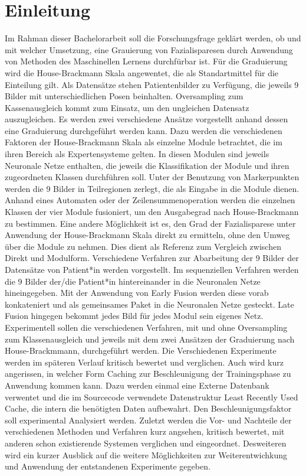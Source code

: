 
\chapter{Einleitung}
\label{einleitung}

Im Rahman dieser Bachelorarbeit soll die Forschungsfrage geklärt werden, ob und mit welcher Umsetzung, eine Grauierung von Fazialisparesen durch Anwendung von Methoden des Maschinellen Lernens durchfürbar ist. Für die Graduierung wird die House-Brackmann Skala angewentet, die als Standartmittel für die Einteilung gilt. Als Datensätze stehen Patientenbilder zu Verfügung, die jeweils 9 Bilder mit unterschiedlichen Posen beinhalten. Oversampling zum Kassenausgleich kommt zum Einsatz, um den ungleichen Datensatz auszugleichen.
Es werden zwei verschiedene Ansätze vorgestellt anhand dessen eine Graduierung durchgeführt werden kann. Dazu werden die verschiedenen Faktoren der House-Brackmann Skala als einzelne Module betrachtet, die im ihren Bereich als Expertensysteme gelten. In diesen Modulen sind jeweils Neuronale Netze enthalten, die jeweils die Klassifikation der Module und ihren zugeordneten Klassen durchführen soll. Unter der Benutzung von Markerpunkten werden die 9 Bilder in Teilregionen zerlegt, die als Eingabe in die Module dienen. Anhand eines Automaten oder der Zeilensummenoperation werden die einzelnen Klassen der vier Module fusioniert, um den Ausgabegrad nach House-Brackmann zu bestimmen. Eine andere Möglichkeit ist es, den Grad der Fazialisparese unter Anwendung der House-Brackmann Skala direkt zu ermitteln, ohne den Umweg über die Module zu nehmen. Dies dient als Referenz zum Vergleich zwischen Direkt und Modulform.
Verschiedene Verfahren zur Abarbeitung der 9 Bilder der Datensätze von Patient*in werden vorgestellt. Im sequenziellen Verfahren werden die 9 Bilder der/die Patient*in hintereinander in die Neuronalen Netze hineingegeben. Mit der Anwendung von Early Fusion werden diese vorab konkateniert und als gemeinsames Paket in die Neuronalen Netze gesteckt. Late Fusion hingegen bekommt jedes Bild für jedes Modul sein eigenes Netz. Experimentell sollen die verschiedenen Verfahren, mit und ohne Oversampling zum Klassenausgleich und jeweils mit dem zwei Ansätzen der Graduierung nach House-Brackmmann, durchgeführt werden. Die Verschiedenen Experimente werden im späteren Verlauf kritisch bewertet und verglichen.
Auch wird kurz angerissen, in welcher Form Caching zur Beschleunigung der Trainingsphase zu Anwendung kommen kann. Dazu werden einmal eine Externe Datenbank verwentet und die im Sourcecode verwendete Datenstruktur Least Recently Used Cache, die intern die benötigten Daten aufbewahrt. Den Beschleunigungsfaktor soll experimental Analysiert werden.
Zuletzt werden die Vor- und Nachteile der verschiedenen Methoden und Verfahren kurz angsehen, kritisch bewertet, mit anderen schon existierende Systemen verglichen und eingeordnet. Desweiteren wird ein kurzer Ausblick auf die weitere Möglichkeiten zur Weiterentwichkung und Anwendung der entstandenen Experimente gegeben.
